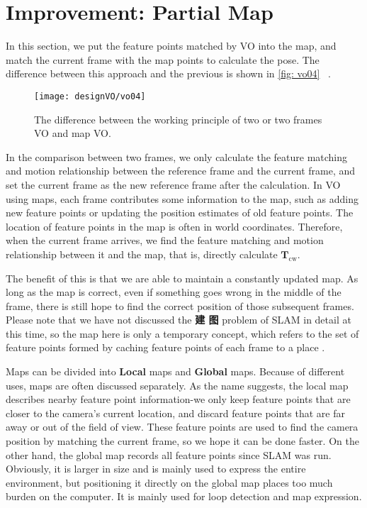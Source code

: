 \section{Improvement: Partial Map}
In this section, we put the feature points matched by VO into the map, and match the current frame with the map points to calculate the pose. The difference between this approach and the previous is shown in \autoref{fig: vo04} ~.

\begin{figure}[!htp]
\centering
\texttt{[image: designVO/vo04]} \\
\caption{The difference between the working principle of two or two frames VO and map VO. }
\label{fig: vo04}
\end{figure}

In the comparison between two frames, we only calculate the feature matching and motion relationship between the reference frame and the current frame, and set the current frame as the new reference frame after the calculation. In VO using maps, each frame contributes some information to the map, such as adding new feature points or updating the position estimates of old feature points. The location of feature points in the map is often in world coordinates. Therefore, when the current frame arrives, we find the feature matching and motion relationship between it and the map, that is, directly calculate $ \bm{T} _{\mathrm{cw}} $.

\newpage
The benefit of this is that we are able to maintain a constantly updated map. As long as the map is correct, even if something goes wrong in the middle of the frame, there is still hope to find the correct position of those subsequent frames. Please note that we have not discussed the \textbf{建 图} problem of SLAM in detail at this time, so the map here is only a temporary concept, which refers to the set of feature points formed by caching feature points of each frame to a place .

Maps can be divided into \textbf{Local} maps and \textbf{Global} maps. Because of different uses, maps are often discussed separately. As the name suggests, the local map describes nearby feature point information-we only keep feature points that are closer to the camera's current location, and discard feature points that are far away or out of the field of view. These feature points are used to find the camera position by matching the current frame, so we hope it can be done faster. On the other hand, the global map records all feature points since SLAM was run. Obviously, it is larger in size and is mainly used to express the entire environment, but positioning it directly on the global map places too much burden on the computer. It is mainly used for loop detection and map expression.

